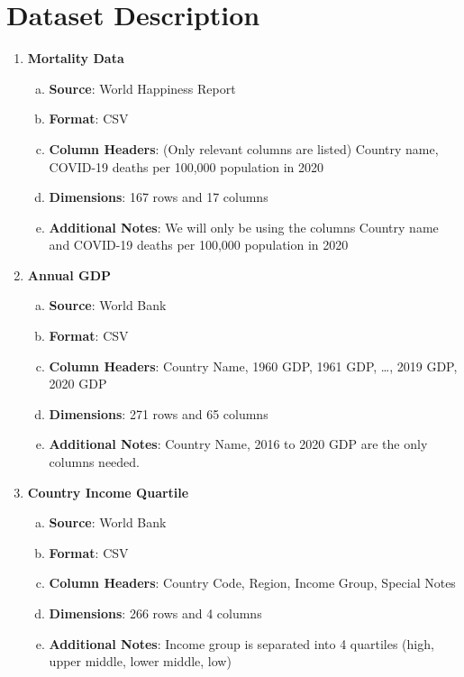 \documentclass[fontsize=11pt]{article}
\begin{document}
\section*{Dataset Description}
\begin{enumerate}
    \item \textbf{Mortality Data}
        \begin{enumerate}[(a)]
            \item \textbf{Source}: World Happiness Report
            \item \textbf{Format}: CSV
            \item \textbf{Column Headers}: (Only relevant columns are listed) Country name, COVID-19 deaths per 100,000 population in 2020
            \item \textbf{Dimensions}: 167 rows and 17 columns
            \item \textbf{Additional Notes}: We will only be using the columns Country name and COVID-19 deaths per 100,000 population in 2020
        \end{enumerate}
    \item \textbf{Annual GDP}
        \begin{enumerate}[(a)]
            \item \textbf{Source}: World Bank
            \item \textbf{Format}: CSV
            \item \textbf{Column Headers}: Country Name, 1960 GDP, 1961 GDP, …, 2019 GDP, 2020 GDP
            \item \textbf{Dimensions}: 271 rows and 65 columns
            \item \textbf{Additional Notes}: Country Name, 2016 to 2020 GDP are the only columns needed.
        \end{enumerate}
    \item \textbf{Country Income Quartile}
        \begin{enumerate}[(a)]
            \item \textbf{Source}: World Bank
            \item \textbf{Format}: CSV
            \item \textbf{Column Headers}: Country Code, Region, Income Group, Special Notes
            \item \textbf{Dimensions}: 266 rows and 4 columns
            \item \textbf{Additional Notes}: Income group is separated into 4 quartiles (high, upper middle, lower middle, low)
        \end{enumerate}

\end{enumerate}
\end{document}
